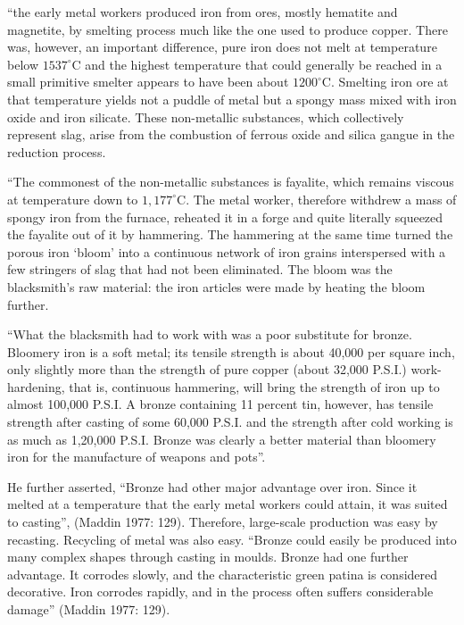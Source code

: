{\footnotesize “the early metal workers produced iron from ores, mostly hematite and magnetite, by smelting process much like the one used to produce copper. There was, however, an important difference, pure iron does not melt at temperature below $1537^{\circ}$C and the highest temperature that could generally be reached in a small primitive smelter appears to have been about $1200^{\circ}$C. Smelting iron ore at that temperature yields not a puddle of metal but a spongy mass mixed with iron oxide and iron silicate. These non-metallic substances, which collectively represent slag, arise from the combustion of ferrous oxide and silica gangue in the reduction process.}

{\footnotesize ``The commonest of the non-metallic substances is fayalite, which remains viscous at temperature down to $1,177^{\circ}$C. The metal worker, therefore withdrew a mass of spongy iron from the furnace, reheated it in a forge and quite literally squeezed the fayalite out of it by hammering. The hammering at the same time turned the porous iron ‘bloom’ into a continuous network of iron grains interspersed with a few stringers of slag that had not been eliminated. The bloom was the blacksmith’s raw material: the iron articles were made by heating the bloom further.}

{\footnotesize “What the blacksmith had to work with was a poor substitute for bronze. Bloomery iron is a soft metal; its tensile strength is about 40,000 per square inch, only slightly more than the strength of pure copper (about 32,000 P.S.I.) work-hardening, that is, continuous hammering, will bring the strength of iron up to almost 100,000 P.S.I. A bronze containing 11 percent tin, however, has tensile strength after casting of some 60,000 P.S.I. and the strength after cold working is as much as 1,20,000 P.S.I. Bronze was clearly a better material than bloomery iron for the manufacture of weapons and pots”.}

He further asserted, “Bronze had other major advantage over iron. Since it melted at a temperature that the early metal workers could attain, it was suited to casting”, (Maddin 1977: 129). Therefore, large-scale production was easy by recasting. Recycling of metal was also easy. {\footnotesize “Bronze could easily be produced into many complex shapes through casting in moulds. Bronze had one further advantage. It corrodes slowly, and the characteristic green patina is considered decorative. Iron corrodes rapidly, and in the process often suffers considerable damage”} (Maddin 1977: 129). 

